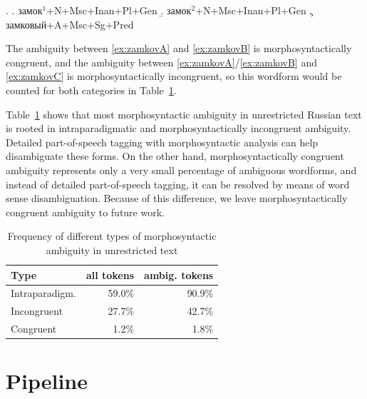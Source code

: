 \documentclass[11pt]{article}
\newcommand{\rus}[1]{\foreignlanguage{russian}{#1}}
\begin{document}
\ex. \label{ex:zamkov}
	 \a. \rus{замок}$^1$+N+Msc+Inan+Pl+Gen \label{ex:zamkovA}
	 \b. \rus{замок}$^2$+N+Msc+Inan+Pl+Gen \label{ex:zamkovB}
	 \c. \rus{замковый}+A+Msc+Sg+Pred      \label{ex:zamkovC}

The ambiguity between \ref{ex:zamkovA} and \ref{ex:zamkovB} is morphosyntactically congruent, and
the ambiguity between \ref{ex:zamkovA}/\ref{ex:zamkovB} and \ref{ex:zamkovC} is
morphosyntactically incongruent, so this wordform would be counted for both categories in
Table~\ref{table:ambiguity}.

Table~\ref{table:ambiguity} shows that most morphosyntactic ambiguity in 
unrestricted Russian text is rooted in intraparadigmatic and morphosyntactically 
incongruent ambiguity. Detailed part-of-speech tagging with morphosyntactic 
analysis can help disambiguate these forms. On the other hand, morphosyntactically congruent
ambiguity represents only a very small percentage of ambiguous wordforms, and instead 
of detailed part-of-speech tagging, it can be resolved by means of word sense disambiguation.
Because of this difference, we leave morphosyntactically congruent ambiguity to future work.

\begin{table}[ht]
  \centering
  \begin{tabular}{l|rr}
    \hline
    \textbf{Type}  & \textbf{all tokens} & \textbf{ambig. tokens} \\
    \hline
    Intraparadigm. & 59.0\%                   & 90.9\%   \\
    Incongruent    & 27.7\%                   & 42.7\%   \\ 
    Congruent      & 1.2\%                   & 1.8\%    \\ 
    \hline
  \end{tabular}
  \caption{Frequency of different types of morphosyntactic ambiguity in unrestricted text}
  \label{table:ambiguity}
\end{table}



\section{Pipeline}
\label{sec:pipeline}
\end{document}
